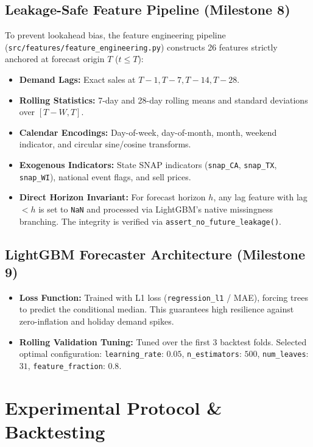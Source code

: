 \documentclass[conference]{IEEEtran}
\begin{document}
\subsection{Leakage-Safe Feature Pipeline (Milestone 8)}
To prevent lookahead bias, the feature engineering pipeline (\texttt{src/features/feature\_engineering.py}) constructs 26 features strictly anchored at forecast origin $T$ ($t \le T$):
\begin{itemize}
    \item \textbf{Demand Lags:} Exact sales at $T-1, T-7, T-14, T-28$.
    \item \textbf{Rolling Statistics:} 7-day and 28-day rolling means and standard deviations over $[T-W, T]$.
    \item \textbf{Calendar Encodings:} Day-of-week, day-of-month, month, weekend indicator, and circular sine/cosine transforms.
    \item \textbf{Exogenous Indicators:} State SNAP indicators (\texttt{snap\_CA}, \texttt{snap\_TX}, \texttt{snap\_WI}), national event flags, and sell prices.
    \item \textbf{Direct Horizon Invariant:} For forecast horizon $h$, any lag feature with lag $< h$ is set to \texttt{NaN} and processed via LightGBM's native missingness branching. The integrity is verified via \texttt{assert\_no\_future\_leakage()}.
\end{itemize}

\subsection{LightGBM Forecaster Architecture (Milestone 9)}
\begin{itemize}
    \item \textbf{Loss Function:} Trained with L1 loss (\texttt{regression\_l1} / MAE), forcing trees to predict the conditional median. This guarantees high resilience against zero-inflation and holiday demand spikes.
    \item \textbf{Rolling Validation Tuning:} Tuned over the first 3 backtest folds. Selected optimal configuration: \texttt{learning\_rate}: $0.05$, \texttt{n\_estimators}: $500$, \texttt{num\_leaves}: $31$, \texttt{feature\_fraction}: $0.8$.
\end{itemize}

\section{Experimental Protocol \& Backtesting}
\end{document}
